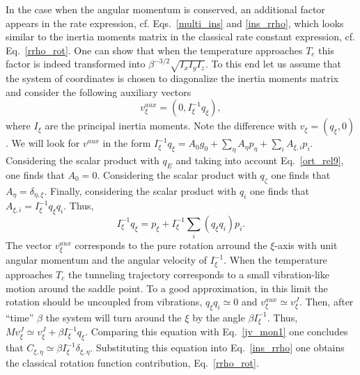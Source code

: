 \documentclass[journal=jpcafh,manuscript=article]{achemso}
\begin{document}
In the case when the angular momentum is conserved, an additional
factor appears in the rate expression, cf. Eqs.~\ref{multi_ins} and
\ref{ins_rrho}, which looks similar to the inertia moments matrix in
the classical rate constant expression, cf. Eq.~\ref{rrho_rot}. One
can show that when the temperature
approaches $T_c$ this factor is indeed transformed into
$\beta^{-3/2}\sqrt{I_xI_yI_z}$. To this end let us assume that the
system of coordinates is chosen to diagonalize the inertia moments
matrix and consider the following auxiliary vectors
\begin{equation}
  \label{aux_vec}
v^{aux}_\xi=(0, I_\xi^{-1}q_\xi),
\end{equation}
where $I_\xi$ are the principal inertia moments. Note the difference
with $v_\xi=(q_\xi,0)$. We will look for $v^{aux}$ in the form
$I_\xi^{-1}q_\xi=A_0g_0+\sum_{\eta}A_{\eta}p_\eta+\sum_iA_{\xi,i}p_i$.
Considering the scalar product with $q_E$ and taking into account
Eq.~\ref{ort_rel9}, one finds that $A_0=0$. Considering the scalar
product with $q_\zeta$ one finds that
$A_\eta=\delta_{\eta,\xi}$. Finally, considering the scalar product
with $q_i$ one finds that $A_{\xi,i}= I_\xi^{-1}q_\xi q_i$. Thus,
\begin{equation}
  \label{aux_vec1}
I_\xi^{-1}q_\xi=p_\xi + I_\xi^{-1}\sum_i(q_\xi q_i)p_i.
\end{equation}
The vector $v^{aux}_\xi$ corresponds to the pure rotation arround the
$\xi$-axis with unit angular momentum and the angular velocity of
$I_\xi^{-1}$. When the temperature approaches $T_c$ the tunneling
trajectory corresponds to a small vibration-like motion around the
saddle point. To a good approximation, in this limit the rotation
should be uncoupled from vibrations, $q_\xi q_i\simeq0$ and
$v^{aux}_\xi\simeq v^J_\xi$. Then, after ``time'' $\beta$ the system
will turn around the $\xi$ by the angle $\beta I_\xi^{-1}$. Thus,
$Mv^J_{\xi}\simeq v^J_\xi + \beta I_\xi^{-1}q_\xi$. Comparing this
equation with Eq.~\ref{jv_mon1} one concludes that
$C_{\xi,\eta}\simeq\beta I_\xi^{-1}\delta_{\xi,\eta}$. Substituting
this equation into Eq.~\ref{ins_rrho} one obtains the classical
rotation function contribution, Eq.~\ref{rrho_rot}.
\end{document}
